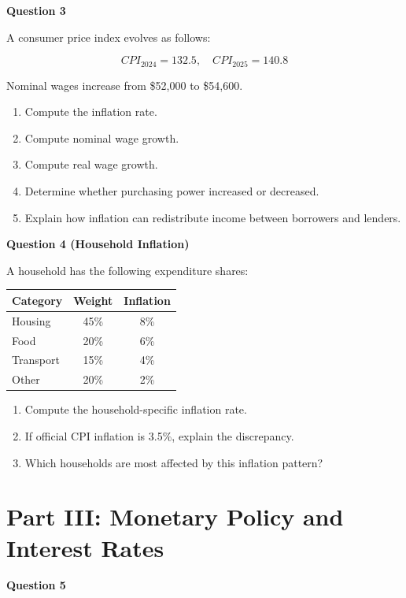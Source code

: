 \documentclass[12pt]{article}
\begin{document}
\textbf{Question 3}

A consumer price index evolves as follows:

\[
CPI_{2024} = 132.5, \quad CPI_{2025} = 140.8
\]

Nominal wages increase from \$52,000 to \$54,600.

\begin{enumerate}[label=(\alph*)]
\item Compute the inflation rate.
\item Compute nominal wage growth.
\item Compute real wage growth.
\item Determine whether purchasing power increased or decreased.
\item Explain how inflation can redistribute income between borrowers and lenders.
\end{enumerate}

\vspace{1em}

\textbf{Question 4 (Household Inflation)}

A household has the following expenditure shares:

\begin{center}
\begin{tabular}{lcc}
\toprule
Category & Weight & Inflation \\
\midrule
Housing & 45\% & 8\% \\
Food & 20\% & 6\% \\
Transport & 15\% & 4\% \\
Other & 20\% & 2\% \\
\bottomrule
\end{tabular}
\end{center}

\begin{enumerate}[label=(\alph*)]
\item Compute the household-specific inflation rate.
\item If official CPI inflation is 3.5\%, explain the discrepancy.
\item Which households are most affected by this inflation pattern?
\end{enumerate}
\newpage
\section*{Part III: Monetary Policy and Interest Rates}

\textbf{Question 5}
\end{document}
